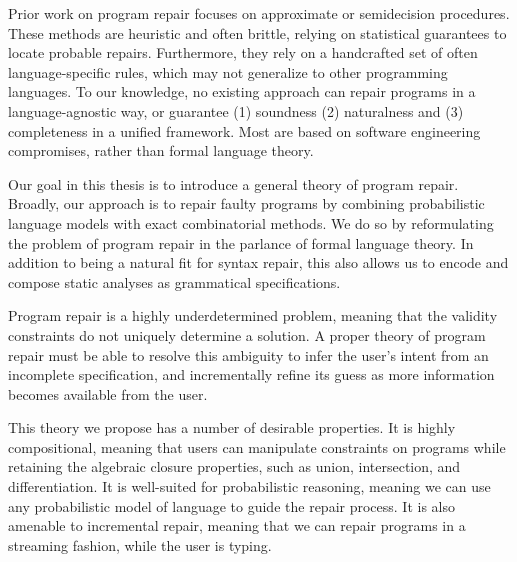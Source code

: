 Prior work on program repair focuses on approximate or semidecision procedures. These methods are heuristic and often brittle, relying on statistical guarantees to locate probable repairs. Furthermore, they rely on a handcrafted set of often language-specific rules, which may not generalize to other programming languages. To our knowledge, no existing approach can repair programs in a language-agnostic way, or guarantee (1) soundness (2) naturalness and (3) completeness in a unified framework. Most are based on software engineering compromises, rather than formal language theory.

Our goal in this thesis is to introduce a general theory of program repair. Broadly, our approach is to repair faulty programs by combining probabilistic language models with exact combinatorial methods. We do so by reformulating the problem of program repair in the parlance of formal language theory. In addition to being a natural fit for syntax repair, this also allows us to encode and compose static analyses as grammatical specifications.

Program repair is a highly underdetermined problem, meaning that the validity constraints do not uniquely determine a solution. A proper theory of program repair must be able to resolve this ambiguity to infer the user's intent from an incomplete specification, and incrementally refine its guess as more information becomes available from the user.

This theory we propose has a number of desirable properties. It is highly compositional, meaning that users can manipulate constraints on programs while retaining the algebraic closure properties, such as union, intersection, and differentiation. It is well-suited for probabilistic reasoning, meaning we can use any probabilistic model of language to guide the repair process. It is also amenable to incremental repair, meaning that we can repair programs in a streaming fashion, while the user is typing.